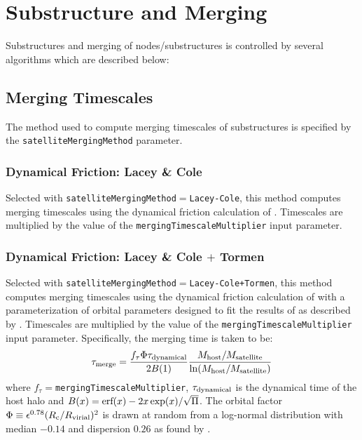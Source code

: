 \section{Substructure and Merging}

Substructures and merging of nodes/substructures is controlled by several algorithms which are described below:

\subsection{Merging Timescales}

The method used to compute merging timescales of substructures is specified by the {\tt satelliteMergingMethod} parameter.

\subsubsection{Dynamical Friction: Lacey \& Cole}

Selected with {\tt satelliteMergingMethod}$=${\tt Lacey-Cole}, this method computes merging timescales using the dynamical friction calculation of \cite{lacey_merger_1993}. Timescales are multiplied by the value of the {\tt mergingTimescaleMultiplier} input parameter.

\subsubsection{Dynamical Friction: Lacey \& Cole $+$ Tormen}

Selected with {\tt satelliteMergingMethod}$=${\tt Lacey-Cole+Tormen}, this method computes merging timescales using the dynamical friction calculation of \cite{lacey_merger_1993} with a parameterization of orbital parameters designed to fit the results of \cite{tormen_rise_1997} as described by \cite{cole_hierarchical_2000}. Timescales are multiplied by the value of the {\tt mergingTimescaleMultiplier} input parameter. Specifically, the merging time is taken to be:
\begin{equation}
 \tau_{\rm merge} = {f_\tau \Phi \tau_{\rm dynamical} \over 2 B(1)} { M_{\rm host}/M_{\rm satellite} \over \ln (M_{\rm host}/M_{\rm satellite})}
\end{equation}
where $f_\tau=${\tt mergingTimescaleMultiplier}, $\tau_{\rm dynamical}$ is the dynamical time of the host halo and $B(x)=\hbox{erf}(x)-2 x \exp(x)/\sqrt{\Pi}$. The orbital factor $\Phi \equiv \epsilon^{0.78} (R_{\rm c}/R_{\rm virial})^2$ is drawn at random from a log-normal distribution with median $-0.14$ and dispersion $0.26$ as found by \cite{cole_hierarchical_2000}.

